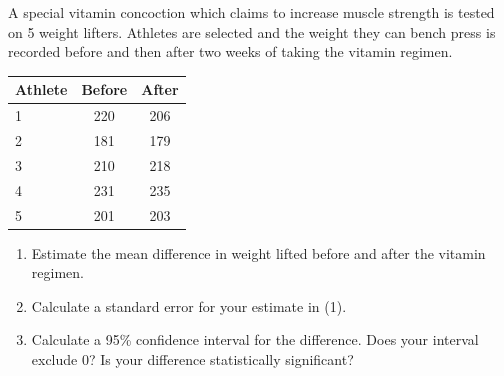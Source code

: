 \documentclass[11pt, chapterprefix=true]{scrbook}\usepackage[]{graphicx}\usepackage[]{color}
\begin{document}
\begin{exercises}
\begin{exercise}
\begin{center}
\end{center}

A special vitamin concoction which claims to increase muscle strength is tested on 5 weight lifters. Athletes are selected and the weight they can bench press is recorded before and then after two weeks of taking the vitamin regimen.

\begin{center}
\begin{tabular}{@{} lcc @{}} \hline
Athlete & Before & After \\ \hline
1 & 220 & 206 \\
2 & 181 & 179 \\
3 & 210 & 218 \\
4 & 231 & 235 \\
5 & 201 & 203 \\ \hline
\end{tabular}
\end{center} 

\begin{enumerate} 
\item Estimate the mean difference in weight lifted before and after the vitamin regimen.
\item Calculate a standard error for your estimate in (1).
\item Calculate a 95\% confidence interval for the difference. Does your interval exclude 0? Is your difference statistically significant?
\end{enumerate}

\end{exercise}
\begin{solution}  %


\end{solution}
\end{exercises}
\end{document}
